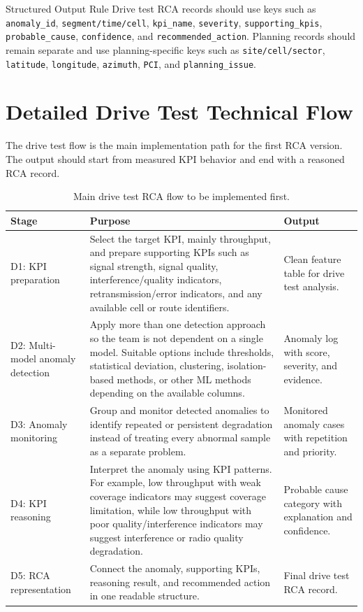 \documentclass[12pt,a4paper]{article}
\newcommand{\colname}[1]{\texttt{#1}}
\begin{document}
\begin{infobox}{Structured Output Rule}
Drive test RCA records should use keys such as \colname{anomaly\_id}, \colname{segment/time/cell}, \colname{kpi\_name}, \colname{severity}, \colname{supporting\_kpis}, \colname{probable\_cause}, \colname{confidence}, and \colname{recommended\_action}. Planning records should remain separate and use planning-specific keys such as \colname{site/cell/sector}, \colname{latitude}, \colname{longitude}, \colname{azimuth}, \colname{PCI}, and \colname{planning\_issue}.
\end{infobox}

\newpage

\section{Detailed Drive Test Technical Flow}

The drive test flow is the main implementation path for the first RCA version. The output should start from measured KPI behavior and end with a reasoned RCA record.

\begin{table}[H]
\centering
\footnotesize
\begin{tabularx}{\textwidth}{P{2.5cm}Y Y}
\toprule
\textbf{Stage} & \textbf{Purpose} & \textbf{Output} \\
\midrule
D1: KPI preparation & Select the target KPI, mainly throughput, and prepare supporting KPIs such as signal strength, signal quality, interference/quality indicators, retransmission/error indicators, and any available cell or route identifiers. & Clean feature table for drive test analysis. \\
\midrule
D2: Multi-model anomaly detection & Apply more than one detection approach so the team is not dependent on a single model. Suitable options include thresholds, statistical deviation, clustering, isolation-based methods, or other ML methods depending on the available columns. & Anomaly log with score, severity, and evidence. \\
\midrule
D3: Anomaly monitoring & Group and monitor detected anomalies to identify repeated or persistent degradation instead of treating every abnormal sample as a separate problem. & Monitored anomaly cases with repetition and priority. \\
\midrule
D4: KPI reasoning & Interpret the anomaly using KPI patterns. For example, low throughput with weak coverage indicators may suggest coverage limitation, while low throughput with poor quality/interference indicators may suggest interference or radio quality degradation. & Probable cause category with explanation and confidence. \\
\midrule
D5: RCA representation & Connect the anomaly, supporting KPIs, reasoning result, and recommended action in one readable structure. & Final drive test RCA record. \\
\bottomrule
\end{tabularx}
\caption{Main drive test RCA flow to be implemented first.}
\end{table}
\end{document}
